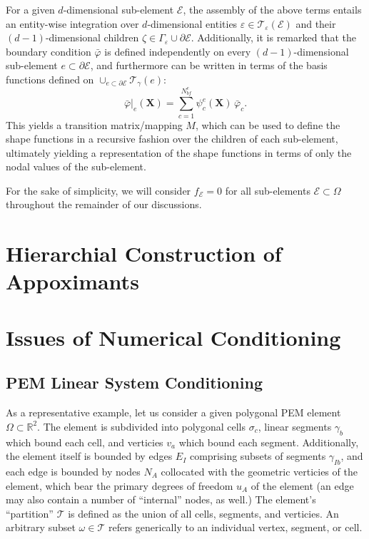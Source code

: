 	For a given $d$-dimensional sub-element $\mathcal{E}$, the assembly of the above terms entails an entity-wise integration over $d$-dimensional entities $\varepsilon \in \mathcal{T}_\varepsilon (\mathcal{E})$ and their $(d-1)$-dimensional children $\zeta \in \Gamma_\varepsilon \cup \partial \mathcal{E}$. Additionally, it is remarked that the boundary condition $\bar{\varphi}$ is defined independently on every $(d-1)$-dimensional sub-element $e \subset \partial \mathcal{E}$, and furthermore can be written in terms of the basis functions defined on $\cup_{e \subset \partial \mathcal{E}} \mathcal{T}_{\gamma} (e)$:
	\begin{equation}
			\bar{\varphi}|_e (\mathbf{X}) = \sum_{c=1}^{N^e_{bf}} \psi^e_c (\mathbf{X}) \, \bar{\varphi}_c.
	\end{equation}
	This yields a transition matrix/mapping $M$, which can be used to define the shape functions in a recursive fashion over the children of each sub-element, ultimately yielding a representation of the shape functions in terms of only the nodal values of the sub-element.
	
	For the sake of simplicity, we will consider $f_\mathcal{E} = 0$ for all sub-elements $\mathcal{E} \subset \Omega$ throughout the remainder of our discussions.
	
\section{Hierarchial Construction of Appoximants}

\section{Issues of Numerical Conditioning}
\subsection{PEM Linear System Conditioning}

As a representative example, let us consider a given polygonal PEM element $\Omega \subset \mathbb{R}^2$. The element is subdivided into polygonal cells $\sigma_c$, linear segments $\gamma_b$ which bound each cell, and verticies $v_a$ which bound each segment. Additionally, the element itself is bounded by edges $E_I$ comprising subsets of segments $\gamma_{Ib}$, and each edge is bounded by nodes $N_A$ collocated with the geometric verticies of the element, which bear the primary degrees of freedom $u_A$ of the element (an edge may also contain a number of ``internal'' nodes, as well.) The element's ``partition'' $\mathcal{T}$ is defined as the union of all cells, segments, and verticies. An arbitrary subset $\omega \in \mathcal{T}$ refers generically to an individual vertex, segment, or cell.

